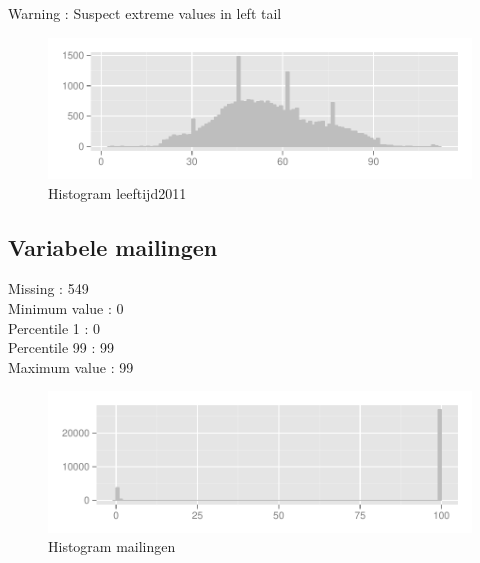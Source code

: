 \documentclass[10pt,a4paper,titlepage]{report}
\begin{document}
\color{red}
Warning : Suspect extreme values in left tail

\color{black}

\begin{figure}[H]
   \centering
\begin{knitrout}
\color{fgcolor}
\includegraphics[width=\maxwidth]{figure/unnamed-chunk-22} 

\end{knitrout}

    \caption{Histogram leeftijd2011}
    \label{fig:figPlot11}
\end{figure}


\subsection{Variabele mailingen}

Missing :  549 \\
Minimum value : 0\\
Percentile 1 : 0\\
Percentile 99 : 99\\
Maximum value : 99

\color{red}


\color{black}

\begin{figure}[H]
   \centering
\begin{knitrout}
\color{fgcolor}
\includegraphics[width=\maxwidth]{figure/unnamed-chunk-24} 

\end{knitrout}

    \caption{Histogram mailingen}
    \label{fig:figPlot12}
\end{figure}
\end{document}
